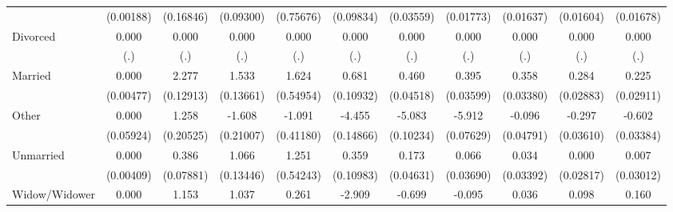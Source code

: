 {\begin{tabular}{l*{10}{c}}
                    &   (0.00188)         &   (0.16846)         &   (0.09300)         &   (0.75676)         &   (0.09834)         &   (0.03559)         &   (0.01773)         &   (0.01637)         &   (0.01604)         &   (0.01678)         \\
Divorced            &       0.000         &       0.000         &       0.000         &       0.000         &       0.000         &       0.000         &       0.000         &       0.000         &       0.000         &       0.000         \\
                    &         (.)         &         (.)         &         (.)         &         (.)         &         (.)         &         (.)         &         (.)         &         (.)         &         (.)         &         (.)         \\
Married             &       0.000         &       2.277\sym{***}&       1.533\sym{***}&       1.624\sym{**} &       0.681\sym{***}&       0.460\sym{***}&       0.395\sym{***}&       0.358\sym{***}&       0.284\sym{***}&       0.225\sym{***}\\
                    &   (0.00477)         &   (0.12913)         &   (0.13661)         &   (0.54954)         &   (0.10932)         &   (0.04518)         &   (0.03599)         &   (0.03380)         &   (0.02883)         &   (0.02911)         \\
Other               &       0.000         &       1.258\sym{***}&      -1.608\sym{***}&      -1.091\sym{**} &      -4.455\sym{***}&      -5.083\sym{***}&      -5.912\sym{***}&      -0.096\sym{*}  &      -0.297\sym{***}&      -0.602\sym{***}\\
                    &   (0.05924)         &   (0.20525)         &   (0.21007)         &   (0.41180)         &   (0.14866)         &   (0.10234)         &   (0.07629)         &   (0.04791)         &   (0.03610)         &   (0.03384)         \\
Unmarried           &       0.000         &       0.386\sym{***}&       1.066\sym{***}&       1.251\sym{*}  &       0.359\sym{**} &       0.173\sym{***}&       0.066         &       0.034         &       0.000         &       0.007         \\
                    &   (0.00409)         &   (0.07881)         &   (0.13446)         &   (0.54243)         &   (0.10983)         &   (0.04631)         &   (0.03690)         &   (0.03392)         &   (0.02817)         &   (0.03012)         \\
Widow/Widower       &       0.000         &       1.153\sym{***}&       1.037\sym{***}&       0.261         &      -2.909\sym{***}&      -0.699\sym{***}&      -0.095\sym{*}  &       0.036         &       0.098\sym{**} &       0.160\sym{***}\\

\end{tabular}}
